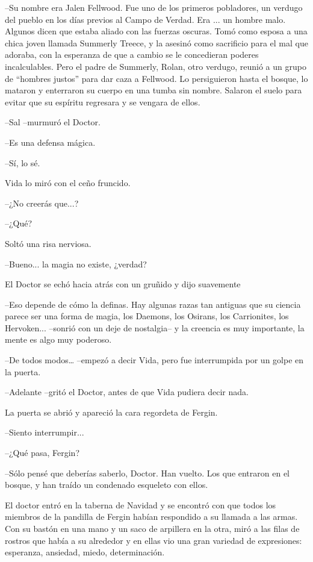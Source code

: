 --Su nombre era Jalen Fellwood. Fue uno de los primeros pobladores, un verdugo del pueblo en los días previos al Campo de Verdad. Era ... un hombre malo. Algunos dicen que estaba aliado con las fuerzas oscuras. Tomó como esposa a una chica joven llamada Summerly Treece, y la asesinó como sacrificio para el mal que adoraba, con la esperanza de que a cambio se le concedieran poderes incalculables. Pero el padre de Summerly, Rolan, otro verdugo, reunió a un grupo de ``hombres justos'' para dar caza a Fellwood. Lo persiguieron hasta el bosque, lo mataron y enterraron su cuerpo en una tumba sin nombre. Salaron el suelo para evitar que su espíritu regresara y se vengara de ellos.

--Sal --murmuró el Doctor.

--Es una defensa mágica.

--Sí, lo sé.

Vida lo miró con el ceño fruncido. 

--¿No creerás que...?

--¿Qué?

Soltó una risa nerviosa. 

--Bueno... la magia no existe, ¿verdad?

El Doctor se echó hacia atrás con un gruñido y dijo suavemente 

--Eso depende de cómo la definas. Hay algunas razas tan antiguas que su ciencia parece ser una forma de magia, los Daemons, los Osirans, los Carrionites, los Hervoken... --sonrió con un deje de nostalgia-- y la creencia es muy importante, la mente es algo muy poderoso.

--De todos modos… --empezó a decir Vida, pero fue interrumpida por un golpe en la puerta.

--Adelante --gritó el Doctor, antes de que Vida pudiera decir nada.

La puerta se abrió y apareció la cara regordeta de Fergin.

--Siento interrumpir...

--¿Qué pasa, Fergin?

--Sólo pensé que deberías saberlo, Doctor. Han vuelto. Los que entraron en el bosque, y han traído un condenado esqueleto con ellos.



\mbox{}



El doctor entró en la taberna de Navidad y se encontró con que todos los miembros de la pandilla de Fergin habían respondido a su llamada a las armas. Con su bastón en una mano y un saco de arpillera en la otra, miró a las filas de rostros que había a su alrededor y en ellas vio una gran variedad de expresiones: esperanza, ansiedad, miedo, determinación.

